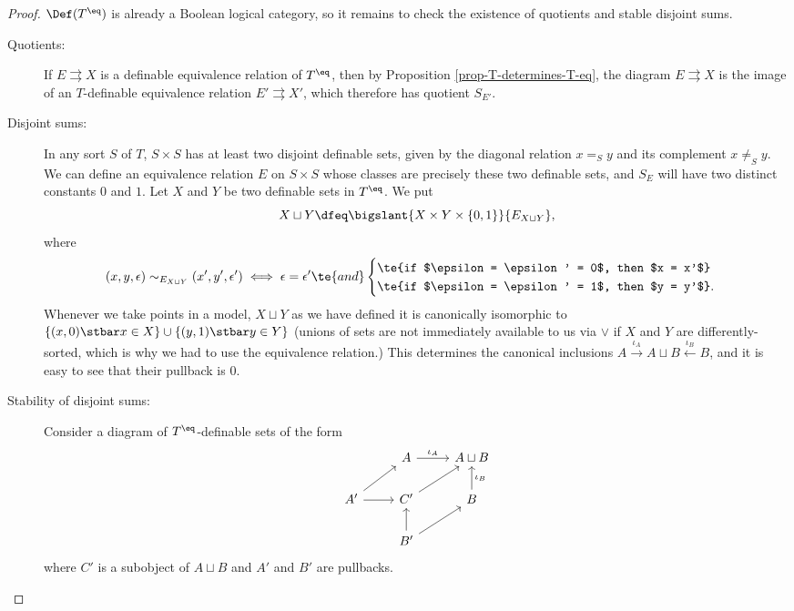 \documentclass[11pt]{article}
\begin{document}

\begin{proof}
  $\Def(T^{\eq})$ is already a Boolean logical category, so it remains to check the existence of quotients and stable disjoint sums.
  \begin{description}
  \item[Quotients: ] If $E \rightrightarrows X$ is a definable equivalence relation of $T^{\eq}$, then by Proposition \ref{prop-T-determines-T-eq}, the diagram $E \rightrightarrows X$ is the image of an $T$-definable equivalence relation $E' \rightrightarrows X'$, which therefore has quotient $S_{E'}$.

  \item[Disjoint sums: ] In any sort $S$ of $T$, $S \times S$ has at least two disjoint definable sets, given by the diagonal relation $x =_S y$ and its complement $x \neq_S y$. We can define an equivalence relation $E$ on $S \times S$ whose classes are precisely these two definable sets, and $S_E$ will have two distinct constants $0$ and $1$. Let $X$ and $Y$ be two definable sets in $T^{\eq}$. We put
    $$
X \sqcup Y \dfeq \bigslant{X \times Y \times \{0,1\}}{E_{X \sqcup Y}},
$$
where
$$
(x,y,\epsilon) \sim_{E_{X \sqcup Y}} (x', y', \epsilon') \iff \epsilon = \epsilon' \te{ and }\begin{cases}
  \te{if $\epsilon = \epsilon' = 0$, then $x = x'$} \\
  \te{if $\epsilon = \epsilon' = 1$, then $y = y'$}.
  \end{cases}
  $$
  Whenever we take points in a model, $X \sqcup Y$ as we have defined it is canonically isomorphic to $\{(x, 0) \stbar x \in X\} \cup \{(y, 1) \stbar y \in Y\}$ (unions of sets are not immediately available to us via $\lor$ if $X$ and $Y$ are differently-sorted, which is why we had to use the equivalence relation.) This determines the canonical inclusions $A \overset{\iota_A}{\longrightarrow} A \sqcup B \overset{\iota_B}{\longleftarrow} B$, and it is easy to see that their pullback is $0$.

\item[Stability of disjoint sums: ] Consider a diagram of $T^{\eq}$-definable sets of the form
  $$ \begin{tikzcd}[ampersand replacement = \&]
  \& A \arrow{r}{\iota_A} \& A \sqcup B \\
  A' \arrow{ur} \arrow{r} \& C' \arrow{ur} \& B \arrow[swap]{u}{\iota_B} \\
  \& B' \arrow{u} \arrow{ur} \&
\end{tikzcd}$$
where $C'$ is a subobject of $A \sqcup B$ and $A'$ and $B'$ are pullbacks.


\end{description}
\end{proof}
\end{document}
